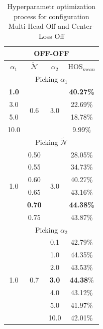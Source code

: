 \documentclass[10pt,twocolumn,letterpaper]{article}
\begin{document}
\begin{table}[h!]
  \centering
  \begin{tabular}[h]{||c|c|c||c||}
    \hline
    \multicolumn{4}{||c||}{OFF-OFF} \\
    \hline
    $\alpha_1$ & $\mathcal{\tilde N}$ & $\alpha_2$ & HOS$_{mean}$\\    
    \hline
    \hline
    \multicolumn{4}{||c||}{Picking $\alpha_1$} \\
    \hline
    {\bf 1.0}  & \multirow{4}{*}{0.6} & \multirow{4}{*}{3.0} & {\bf 40.27\%} \\
    3.0  & & & 22.69\% \\
    5.0  & & & 18.78\% \\
    10.0 & & & 9.99\% \\
    \hline
    \hline
    \multicolumn{4}{||c||}{Picking $\mathcal{\tilde N}$} \\
    \hline
    \multirow{6}{*}{1.0} & 0.50 & \multirow{6}{*}{3.0}  & 28.05\%\\
    & 0.55 & & 34.73\% \\
    & 0.60 & & 40.27\% \\
    & 0.65 & & 43.16\% \\
    & {\bf 0.70} & & {\bf 44.38\%} \\
    & 0.75 & & 43.87\% \\
    \hline
    \hline
    \multicolumn{4}{||c||}{Picking $\alpha_2$} \\
    \hline
    \multirow{7}{*}{1.0} & \multirow{7}{*}{0.7} & 0.1 & 42.79\%\\
    && 1.0 & 44.35\% \\
    && 2.0 & 43.53\% \\
    && {\bf 3.0} & {\bf 44.38}\% \\
    && 4.0 & 43.12\% \\
    && 5.0 & 41.97\% \\
    && 10.0 & 42.01\% \\
    \hline
  \end{tabular}
  \caption{\centering\label{tab:ablationoffoff} Hyperparametr optimization process for configuration Multi-Head Off and Center-Loss Off}
\end{table}
\end{document}
